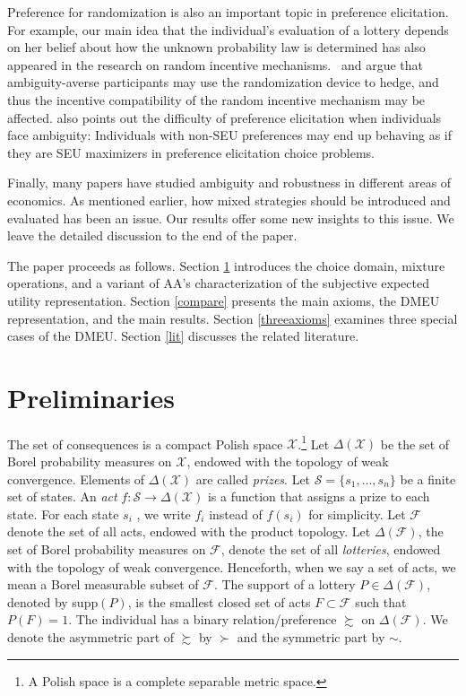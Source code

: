 \documentclass[12pt, notitlepage]{article}
\begin{document}
Preference for randomization is also an important topic in preference
elicitation. For example, our main idea that the individual's evaluation of
a lottery depends on her belief about how the unknown probability law is
determined has also appeared in the research on random incentive mechanisms. 
\cite{Bade15}\ and \cite{BaillonHalevyLi15} argue that ambiguity-averse
participants may use the randomization device to hedge, and thus the
incentive compatibility of the random incentive mechanism may be affected. 
\cite{Kuzmics17} also points out the difficulty of preference elicitation
when individuals face ambiguity: Individuals with non-SEU preferences may
end up behaving as if they are SEU maximizers in preference elicitation
choice problems.

Finally, many papers have studied ambiguity and robustness in different
areas of economics. As mentioned earlier, how mixed strategies should be
introduced and evaluated has been an issue. Our results offer some new
insights to this issue. We leave the detailed discussion to the end of the
paper.

The paper proceeds as follows. Section \ref{mainsection} introduces the
choice domain, mixture operations, and a variant of AA's characterization of
the subjective expected utility representation. Section \ref{compare}
presents the main axioms, the DMEU representation, and the main results.
Section \ref{threeaxioms} examines three special cases of the DMEU. Section %
\ref{lit} discusses the related literature.

\section{Preliminaries}

\label{mainsection}The set of consequences is a compact Polish space $%
\mathcal{X}$.\footnote{%
A Polish space is a complete separable metric space.} Let $\Delta (\mathcal{X%
})$ be the set of Borel probability measures on $\mathcal{X}$, endowed with
the topology of weak convergence. Elements of $\Delta (\mathcal{X})$ are
called \textit{prizes}. Let $\mathcal{S}=\{s_{1},\dots ,s_{n}\}$ be a finite
set of states. An \textit{act} $f:\mathcal{S}\rightarrow \Delta (\mathcal{X}%
) $ is a function that assigns a prize to each state. For each state $s_{i}$%
, we write $f_{i}$ instead of $f(s_{i})$ for simplicity. Let $\mathcal{F}$
denote the set of all acts, endowed with the product topology. Let $\Delta (%
\mathcal{F})$, the set of Borel probability measures on $\mathcal{F}$,
denote the set of all \textit{lotteries}, endowed with the topology of weak
convergence. Henceforth, when we say a set of acts, we mean a Borel
measurable subset of $\mathcal{F}$. The support of a lottery $P\in \Delta (%
\mathcal{F})$, denoted by supp$(P)$, is the smallest closed set of acts $%
F\subset \mathcal{F}$ such that $P(F)=1$. The individual has a binary
relation/preference $\succsim $ on $\Delta (\mathcal{F})$. We denote the
asymmetric part of $\succsim $ by $\succ $ and the symmetric part by $\sim $.
\end{document}
